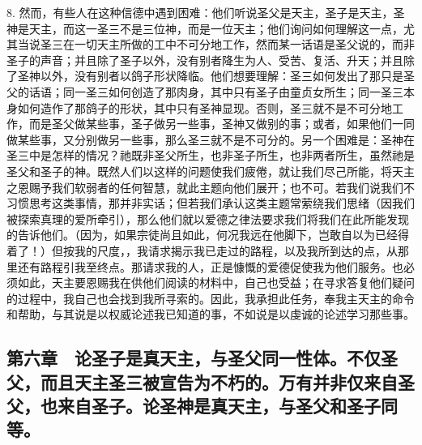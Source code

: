 8. 然而，有些人在这种信德中遇到困难：他们听说圣父是天主，圣子是天主，圣神是天主，而这一圣三不是三位神，而是一位天主；他们询问如何理解这一点，尤其当说圣三在一切天主所做的工中不可分地工作，然而某一话语是圣父说的，而非圣子的声音；并且除了圣子以外，没有别者降生为人、受苦、复活、升天；并且除了圣神以外，没有别者以鸽子形状降临。他们想要理解：圣三如何发出了那只是圣父的话语；同一圣三如何创造了那肉身，其中只有圣子由童贞女所生；同一圣三本身如何造作了那鸽子的形状，其中只有圣神显现。否则，圣三就不是不可分地工作，而是圣父做某些事，圣子做另一些事，圣神又做别的事；或者，如果他们一同做某些事，又分别做另一些事，那么圣三就不是不可分的。另一个困难是：圣神在圣三中是怎样的情况？祂既非圣父所生，也非圣子所生，也非两者所生，虽然祂是圣父和圣子的神。既然人们以这样的问题使我们疲倦，就让我们尽己所能，将天主之恩赐予我们软弱者的任何智慧，就此主题向他们展开；也不可。若我们说我们不习惯思考这类事情，那并非实话；但若我们承认这类主题常萦绕我们思绪（因我们被探索真理的爱所牵引），那么他们就以爱德之律法要求我们将我们在此所能发现的告诉他们。（因为，如果宗徒尚且如此，何况我远在他脚下，岂敢自以为已经得着了！）但按我的尺度，，我请求揭示我已走过的路程，以及我所到达的点，从那里还有路程引我至终点。那请求我的人，正是慷慨的爱德促使我为他们服务。也必须如此，天主要恩赐我在供他们阅读的材料中，自己也受益；在寻求答复他们疑问的过程中，我自己也会找到我所寻索的。因此，我承担此任务，奉我主天主的命令和帮助，与其说是以权威论述我已知道的事，不如说是以虔诚的论述学习那些事。\par


\subsection{第六章　论圣子是真天主，与圣父同一性体。不仅圣父，而且天主圣三被宣告为不朽的。万有并非仅来自圣父，也来自圣子。论圣神是真天主，与圣父和圣子同等。}

